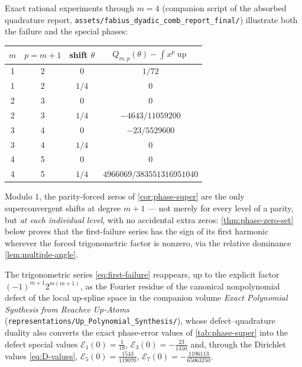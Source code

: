 \documentclass[11pt,oneside]{article}
\numberwithin{equation}{section}
\theoremstyle{definition}
\theoremstyle{remark}
\newcommand{\Up}{\operatorname{up}}
\begin{document}
Exact rational experiments through $m=4$ (companion script of the
absorbed quadrature report,
\nolinkurl{assets/fabius_dyadic_comb_report_final/}) illustrate both
the failure and the special phases:

\begin{center}
\small
\begin{tabular}{c c c c}
\toprule
$m$ & $p=m+1$ & shift $\theta$ & $Q_{m,p}(\theta)-\int x^{p}\Up$ \\
\midrule
1 & 2 & $0$ & $1/72$ \\
1 & 2 & $1/4$ & $0$ \\
2 & 3 & $0$ & $0$ \\
2 & 3 & $1/4$ & $-4643/11059200$ \\
3 & 4 & $0$ & $-23/5529600$ \\
3 & 4 & $1/4$ & $0$ \\
4 & 5 & $0$ & $0$ \\
4 & 5 & $1/4$ & $4966069/383551316951040$ \\
\bottomrule
\end{tabular}
\label{tab:phase-super}
\end{center}

\begin{remark}
\label{conj:phase-classification}
Modulo $1$, the parity-forced zeros of \cref{cor:phase-super} are the
only superconvergent shifts at degree $m+1$ --- not merely for every
level of a parity, but \emph{at each individual level}, with no
accidental extra zeros: \cref{thm:phase-zero-set} below proves that
the first-failure series has the sign of its first harmonic wherever
the forced trigonometric factor is nonzero, via the relative
dominance \cref{lem:multiple-angle}.
\end{remark}

\begin{remark}
The trigonometric series \eqref{eq:first-failure} reappears, up to
the explicit factor $(-1)^{m+1}2^{m(m+1)}$, as the Fourier residue of
the canonical nonpolynomial defect of the local up-spline space in
the companion volume \emph{Exact Polynomial Synthesis from Rvachev
Up-Atoms} (\nolinkurl{representations/Up_Polynomial_Synthesis/}),
whose defect--quadrature duality also converts the exact phase-error
values of \cref{tab:phase-super} into the defect special values
$\mathcal E_1(0)=\tfrac1{18}$,
$\mathcal E_3(0)=-\tfrac{23}{1350}$ and, through the Dirichlet
values \eqref{eq:D-values},
$\mathcal E_5(0)=\tfrac{1543}{119070}$,
$\mathcal E_7(0)=-\tfrac{1196113}{65063250}$.
\end{remark}
\end{document}
